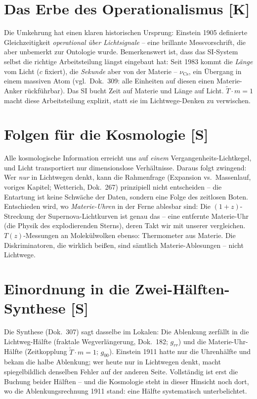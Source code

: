 \documentclass[11pt]{report}
\begin{document}
\section{Das Erbe des Operationalismus [K]}

Die Umkehrung hat einen klaren historischen Ursprung: Einstein 1905
definierte Gleichzeitigkeit \emph{operational über
Lichtsignale} -- eine brillante Messvorschrift, die aber
unbemerkt zur Ontologie wurde. Bemerkenswert ist, dass das
SI-System selbst die richtige Arbeitsteilung längst eingebaut hat:
Seit 1983 kommt die \emph{Länge} vom Licht ($c$ fixiert), die
\emph{Sekunde} aber von der Materie -- $\nu_\text{Cs}$, ein
Übergang in einem massiven Atom (vgl.\ Dok.~309: alle Einheiten
auf diesen einen Materie-Anker rückführbar). Das SI bucht Zeit auf
Materie und Länge auf Licht. $\tilde T \cdot m = 1$ macht diese
Arbeitsteilung explizit, statt sie im Lichtwege-Denken zu
verwischen.

\section{Folgen für die Kosmologie [S]}

Alle kosmologische Information erreicht uns auf \emph{einem}
Vergangenheits-Lichtkegel, und Licht transportiert nur
dimensionslose Verhältnisse. Daraus folgt zwingend: Wer
\emph{nur} in Lichtwegen denkt, kann die Rahmenfrage (Expansion
vs.\ Massenlauf, voriges Kapitel; Wetterich, Dok.~267) prinzipiell
nicht entscheiden -- die Entartung ist keine Schwäche der Daten,
sondern eine Folge des zeitlosen Boten. Entschieden wird, wo
\emph{Materie-Uhren} in der Ferne ablesbar sind: Die
$(1+z)$-Streckung der Supernova-Lichtkurven ist genau das -- eine
entfernte Materie-Uhr (die Physik des explodierenden Sterns), deren
Takt wir mit unserer vergleichen. $T(z)$-Messungen an
Molekülwolken ebenso: Thermometer aus Materie. Die
Diskriminatoren, die wirklich beißen, sind sämtlich
Materie-Ablesungen -- nicht Lichtwege.

\section{Einordnung in die Zwei-Hälften-Synthese [S]}

Die Synthese (Dok.~307) sagt dasselbe im Lokalen: Die Ablenkung
zerfällt in die Lichtweg-Hälfte (fraktale Wegverlängerung,
Dok.~182; $g_{rr}$) und die Materie-Uhr-Hälfte (Zeitkopplung
$\tilde T \cdot m = 1$; $g_{00}$). Einstein 1911 hatte nur die
Uhrenhälfte und bekam die halbe Ablenkung; wer heute nur in
Lichtwegen denkt, macht spiegelbildlich denselben Fehler auf der
anderen Seite. Vollständig ist erst die Buchung beider Hälften --
und die Kosmologie steht in dieser Hinsicht noch dort, wo die
Ablenkungsrechnung 1911 stand: eine Hälfte systematisch
unterbelichtet.
\end{document}
